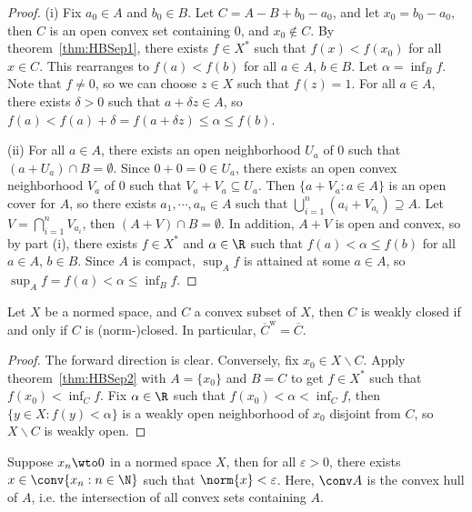 \documentclass[a4paper]{article}
\begin{document}
\begin{proof}
  (i) Fix $a_0\in A$ and $b_0\in B$. Let $C=A-B+b_0-a_0$, and let $x_0=b_0-a_0$, then $C$ is an open convex set containing 0, and $x_0\notin C$. By theorem~\ref{thm:HBSep1}, there exists $f\in X^*$ such that $f(x)<f(x_0)$ for all $x\in C$. This rearranges to $f(a)<f(b)$ for all $a\in A$, $b\in B$. Let $\alpha=\inf_B f$. Note that $f\not= 0$, so we can choose $z\in X$ such that $f(z)=1$. For all $a\in A$, there exists $\delta>0$ such that $a+\delta z\in A$, so $f(a)<f(a)+\delta=f(a+\delta z)\leq\alpha\leq f(b)$.

  (ii) For all $a\in A$, there exists an open neighborhood $U_a$ of 0 such that $(a+U_a)\cap B=\emptyset$. Since $0+0=0\in U_a$, there exists an open convex neighborhood $V_a$ of 0 such that $V_a+V_a\subseteq U_a$. Then $\{a+V_a:a\in A\}$ is an open cover for $A$, so there exists $a_1,\cdots,a_n\in A$ such that $\bigcup_{i=1}^n(a_i+V_{a_i})\supseteq A$. Let $V=\bigcap_{i=1}^n V_{a_i}$, then $(A+V)\cap B=\emptyset$. In addition, $A+V$ is open and convex, so by part (i), there exists $f\in X^*$ and $\alpha\in\R$ such that $f(a)<\alpha\leq f(b)$ for all $a\in A$, $b\in B$. Since $A$ is compact, $\sup_A f$ is attained at some $a\in A$, so $\sup_A f=f(a)<\alpha\leq\inf_B f$.
\end{proof}

\begin{nthm}\label{thm:MazurWeakClosure}
  Let $X$ be a normed space, and $C$ a convex subset of $X$, then $C$ is weakly closed if and only if $C$ is (norm-)closed. In particular, $\overline{C}^\mathrm{w}=\overline{C}$.
\end{nthm}

\begin{proof}
  The forward direction is clear. Conversely, fix $x_0\in X\backslash C$. Apply theorem~\ref{thm:HBSep2} with $A=\{x_0\}$ and $B=C$ to get $f\in X^*$ such that $f(x_0)<\inf_C f$. Fix $\alpha\in\R$ such that $f(x_0)<\alpha<\inf_C f$, then $\{y\in X:f(y)<\alpha\}$ is a weakly open neighborhood of $x_0$ disjoint from $C$, so $X\backslash C$ is weakly open.
\end{proof}

\begin{ncor}\label{cor:MazurWeaklyNull}
  Suppose $x_n\wto 0$ in a normed space $X$, then for all $\varepsilon>0$, there exists $x\in\conv\{x_n:n\in\N\}$ such that $\norm{x}<\varepsilon$. Here, $\conv A$ is the convex hull of $A$, i.e. the intersection of all convex sets containing $A$.
\end{ncor}
\end{document}

